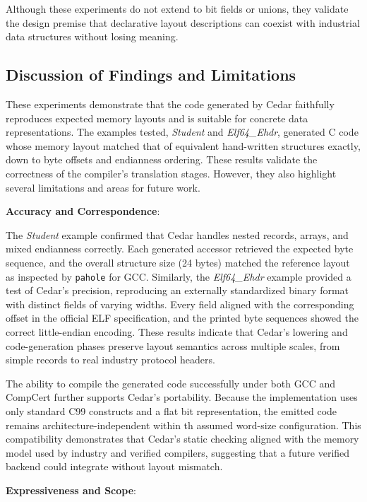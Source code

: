Although these experiments do not extend to bit fields or unions, they
validate the design premise that declarative layout
descriptions can coexist with industrial data structures without losing meaning.

\subsection{Discussion of Findings and Limitations}

These experiments demonstrate that the code generated by Cedar
faithfully reproduces expected memory layouts and is suitable for
concrete data representations.
The examples tested,
\textit{Student} and \textit{Elf64\_Ehdr}, generated C code
whose memory layout matched that of equivalent hand-written structures
exactly, down to byte offsets and endianness ordering.
These results validate the correctness of the compiler's translation
stages. However, they also highlight several limitations and areas for future work.

\textbf{Accuracy and Correspondence}:

The \textit{Student} example confirmed that Cedar handles
nested records, arrays, and mixed endianness correctly.
Each generated accessor retrieved the expected byte sequence, and the
overall structure size (24 bytes) matched the reference layout as
inspected by \texttt{pahole} for GCC. Similarly, the \textit{Elf64\_Ehdr}
example provided a test of Cedar's precision, reproducing an externally
standardized binary format with distinct fields of varying widths. 
Every field aligned with the corresponding offset in the official 
ELF specification, and the printed byte sequences
showed the correct little-endian encoding. These results indicate that Cedar's
lowering and code-generation phases preserve layout semantics across multiple
scales, from simple records to real industry protocol headers.

The ability to compile the generated code successfully
under both GCC and CompCert further supports Cedar's portability.
Because the implementation uses only standard C99 constructs and a flat
bit representation, the emitted code remains architecture-independent
within th assumed word-size configuration. This compatibility demonstrates
that Cedar's static checking aligned with the memory model used by industry 
and verified compilers, suggesting that a future verified backend
could integrate without layout mismatch.

\textbf{Expressiveness and Scope}:

